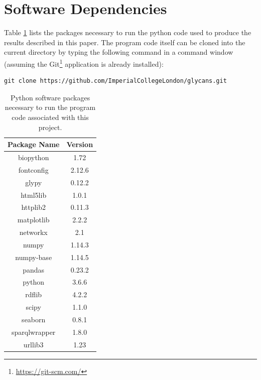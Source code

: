 \documentclass[12pt,a4paper]{article}
\begin{document}
\section{Software Dependencies}
\label{sec:software_dependencies}
Table \ref{tab:software_dependencies} lists the packages necessary to run the python code used to produce the results described in this paper. The program code itself can be cloned into the current directory by typing the following command in a command window (assuming the Git\footnote{\url{https://git-scm.com/}} application is already installed):

\begin{verbatim}
git clone https://github.com/ImperialCollegeLondon/glycans.git
\end{verbatim}

\begin{table}[h]
\centering
\begin{tabular}{|c|c|} \hline
{\bf Package Name} & {\bf Version} \\ \hline
biopython   &               1.72 \\ \hline
fontconfig    &             2.12.6 \\ \hline
glypy       &               0.12.2 \\ \hline
html5lib   &                1.0.1 \\ \hline
httplib2   &                0.11.3 \\ \hline
matplotlib &                2.2.2 \\ \hline
networkx  &                 2.1 \\ \hline
numpy    &                  1.14.3 \\ \hline
numpy-base   &              1.14.5 \\ \hline
pandas  &                   0.23.2 \\ \hline
python   &                  3.6.6 \\ \hline
rdflib  &                   4.2.2 \\ \hline
scipy   &                   1.1.0 \\ \hline
seaborn  &                  0.8.1 \\ \hline
sparqlwrapper   &           1.8.0 \\ \hline
urllib3      &              1.23 \\ \hline
\end{tabular}
\caption{Python software packages necessary to run the program code associated with this project.}
\label{tab:software_dependencies}
\end{table}
\clearpage
\end{document}
